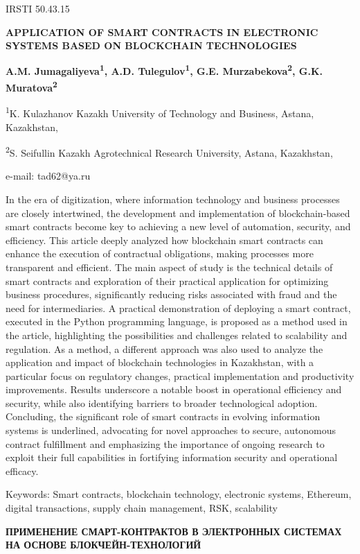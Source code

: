IRSTI 50.43.15

{\bfseries APPLICATION OF SMART CONTRACTS IN ELECTRONIC SYSTEMS BASED ON
BLOCKCHAIN TECHNOLOGIES}

{\bfseries A.M. Jumagaliyeva\textsuperscript{1}, A.D.
Tulegulov\textsuperscript{1}, G.E. Murzabekova\textsuperscript{2}, G.K.
Muratova\textsuperscript{2}}

\textsuperscript{1}K. Kulazhanov Kazakh University of Technology and
Business, Astana, Kazakhstan,

\textsuperscript{2}S. Seifullin Kazakh Agrotechnical Research
University, Astana, Kazakhstan,

e-mail: tad62@ya.ru

In the era of digitization, where information technology and business
processes are closely intertwined, the development and implementation of
blockchain-based smart contracts become key to achieving a new level of
automation, security, and efficiency. This article deeply analyzed how
blockchain smart contracts can enhance the execution of contractual
obligations, making processes more transparent and efficient. The main
aspect of study is the technical details of smart contracts and
exploration of their practical application for optimizing business
procedures, significantly reducing risks associated with fraud and the
need for intermediaries. A practical demonstration of deploying a smart
contract, executed in the Python programming language, is proposed as a
method used in the article, highlighting the possibilities and
challenges related to scalability and regulation. As a method, a
different approach was also used to analyze the application and impact
of blockchain technologies in Kazakhstan, with a particular focus on
regulatory changes, practical implementation and productivity
improvements. Results underscore a notable boost in operational
efficiency and security, while also identifying barriers to broader
technological adoption. Concluding, the significant role of smart
contracts in evolving information systems is underlined, advocating for
novel approaches to secure, autonomous contract fulfillment and
emphasizing the importance of ongoing research to exploit their full
capabilities in fortifying information security and operational
efficacy.

Keywords: Smart contracts, blockchain technology, electronic systems,
Ethereum, digital transactions, supply chain management, RSK,
scalability

{\bfseries ПРИМЕНЕНИЕ СМАРТ-КОНТРАКТОВ В ЭЛЕКТРОННЫХ СИСТЕМАХ НА ОСНОВЕ
БЛОКЧЕЙН-ТЕХНОЛОГИЙ}

